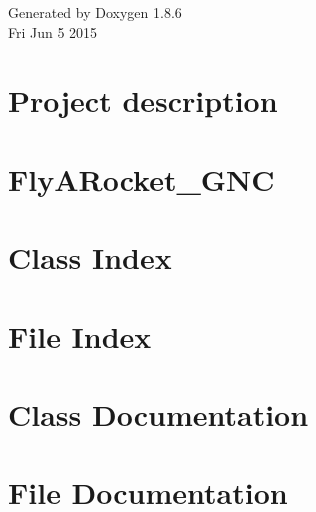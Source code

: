 \documentclass[twoside]{book}
\newcommand{\clearemptydoublepage}{%
  \newpage{\pagestyle{empty}\cleardoublepage}%
}
\begin{document}
\begin{titlepage}
\begin{center}
\vfill

{\large Generated by Doxygen 1.8.6}\\
\vspace*{0.5cm}
{\small Fri Jun 5 2015}\\

\end{center}



\end{titlepage}
\clearemptydoublepage
\tableofcontents
\clearemptydoublepage
{}
\hypersetup{pageanchor=true}

\chapter{Project description}
\label{index}\hypertarget{index}{}
\chapter{Fly\-A\-Rocket\-\_\-\-G\-N\-C}
\label{md_README}
\hypertarget{md_README}{}

\chapter{Class Index}

\chapter{File Index}

\chapter{Class Documentation}




\chapter{File Documentation}




















\newpage
{}
{}
\printindex
\end{document}
